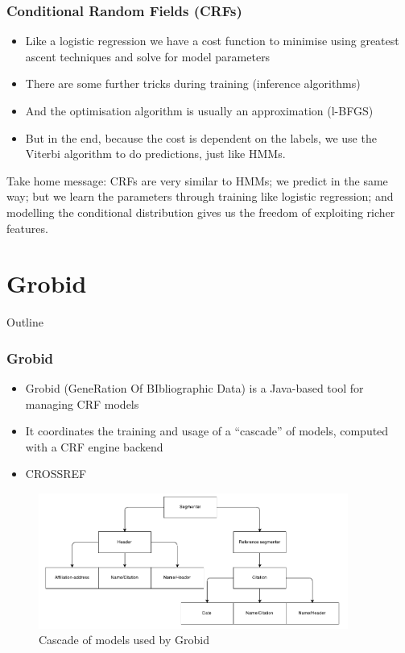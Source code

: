 \documentclass{beamer}
\begin{document}


\begin{frame}
\frametitle{Conditional Random Fields (CRFs)}
\begin{itemize}
\item Like a logistic regression we have a cost function to minimise using greatest ascent techniques and solve for model parameters
\item There are some further tricks during training (inference algorithms)
\item And the optimisation algorithm is usually an approximation (l-BFGS)
\item But in the end, because the cost is dependent on the labels, we use the Viterbi algorithm to do predictions, just like HMMs.
\end{itemize}
Take home message: CRFs are very similar to HMMs; we predict in the same way; but we learn the parameters through training like logistic regression; and modelling the conditional distribution gives us the freedom of exploiting richer features.
\end{frame}


\section{Grobid}
\begin{frame}[noframenumbering]{Outline}
\tableofcontents[currentsection]
\end{frame}


\begin{frame}
\frametitle{Grobid}
\begin{itemize}
\item Grobid (GeneRation Of BIbliographic Data) is a Java-based tool for managing CRF models 
\item It coordinates the training and usage of a ``cascade'' of models, computed with a CRF engine backend
\item CROSSREF
\end{itemize}
\begin{figure}[!ht]
\center
\includegraphics[width=4in]{figures/cascade.pdf}
\caption{Cascade of models used by Grobid}
\end{figure}
\end{frame}
\end{document}
